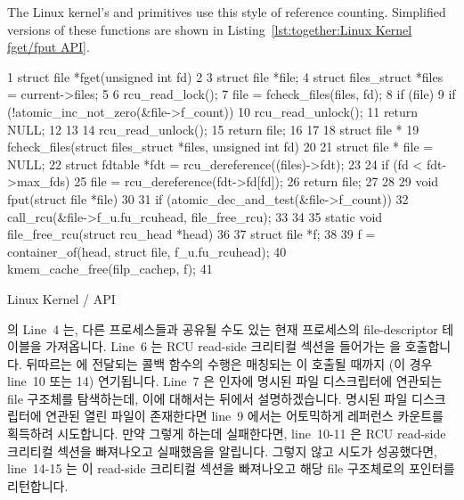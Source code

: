 The Linux kernel's  and  primitives
use this style of reference counting.
Simplified versions of these functions are shown in
Listing~\ref{lst:together:Linux Kernel fget/fput API}.
\fi

\begin{listing}[tbp]
{ \fontsize{6.5pt}{7.5pt}\selectfont
\begin{verbbox}
  1 struct file *fget(unsigned int fd)
  2 {
  3   struct file *file;
  4   struct files_struct *files = current->files;
  5
  6   rcu_read_lock();
  7   file = fcheck_files(files, fd);
  8   if (file) {
  9     if (!atomic_inc_not_zero(&file->f_count)) {
 10       rcu_read_unlock();
 11       return NULL;
 12     }
 13   }
 14   rcu_read_unlock();
 15   return file;
 16 }
 17
 18 struct file *
 19 fcheck_files(struct files_struct *files, unsigned int fd)
 20 {
 21   struct file * file = NULL;
 22   struct fdtable *fdt = rcu_dereference((files)->fdt);
 23
 24   if (fd < fdt->max_fds)
 25     file = rcu_dereference(fdt->fd[fd]);
 26   return file;
 27 }
 28
 29 void fput(struct file *file)
 30 {
 31   if (atomic_dec_and_test(&file->f_count))
 32     call_rcu(&file->f_u.fu_rcuhead, file_free_rcu);
 33 }
 34
 35 static void file_free_rcu(struct rcu_head *head)
 36 {
 37   struct file *f;
 38
 39   f = container_of(head, struct file, f_u.fu_rcuhead);
 40   kmem_cache_free(filp_cachep, f);
 41 }
\end{verbbox}
}
\centering
\theverbbox
\caption{Linux Kernel / API}
\label{lst:together:Linux Kernel fget/fput API}
\end{listing}

 의 Line~4 는, 다른 프로세스들과 공유될 수도 있는 현재 프로세스의
file-descriptor 테이블을 가져옵니다.
Line~6 는 RCU read-side 크리티컬 섹션을 들어가는  을
호출합니다.
뒤따르는  에 전달되는 콜백 함수의 수행은 매칭되는
 이 호출될 때까지 (이 경우 line~10 또는 14) 연기됩니다.
Line~7 은  인자에 명시된 파일 디스크립터에 연관되는 file 구조체를
탐색하는데, 이에 대해서는 뒤에서 설명하겠습니다.
명시된 파일 디스크립터에 연관된 열린 파일이 존재한다면 line~9 에서는 어토믹하게
레퍼런스 카운트를 획득하려 시도합니다.
만약 그렇게 하는데 실패한다면, line~10-11 은 RCU read-side 크리티컬 섹션을
빠져나오고 실패했음을 알립니다.
그렇지 않고 시도가 성공했다면, line~14-15 는 이 read-side 크리티컬 섹션을
빠져나오고 해당 file 구조체로의 포인터를 리턴합니다.
\iffalse

